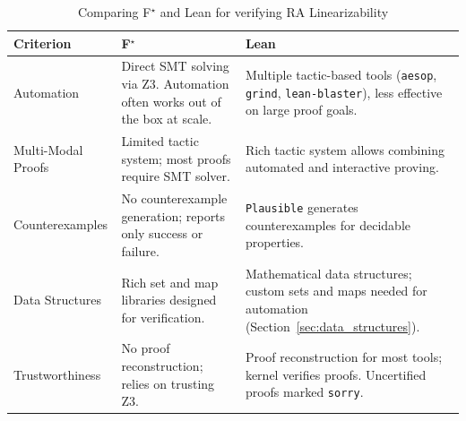 \documentclass[sigplan,twocolumn,accept]{acmart}
\newcommand{\fstar}{F$^{\star}$\xspace}
\begin{document}
\begin{table}[htpb]
\centering
\caption{Comparing \fstar and Lean for verifying RA Linearizability}
\label{tab:fstar_lean_comp}

\begin{tabular}{p{} p{} p{}}
\toprule
\textbf{Criterion} & \textbf{\fstar} & \textbf{Lean} \\
\midrule
Automation &
Direct SMT solving via Z3. Automation often works out of the box at scale.
&
Multiple tactic-based tools (\texttt{aesop}, \texttt{grind}, \texttt{lean-blaster}), less effective on large proof goals.
\\
\midrule
Multi-Modal Proofs &
Limited tactic system; most proofs require SMT solver.
&
Rich tactic system allows combining automated and interactive proving.
\\
\midrule
Counterexamples &
No counterexample generation; reports only success or failure.
&
\texttt{Plausible} generates counterexamples for decidable properties.
\\
\midrule
Data Structures &
Rich set and map libraries designed for verification.
&
Mathematical data structures; custom sets and maps needed for automation (Section~\ref{sec:data_structures}).
\\
\midrule
Trustworthiness &
No proof reconstruction; relies on trusting Z3.
&
Proof reconstruction for most tools; kernel verifies proofs. Uncertified proofs marked \texttt{sorry}.
\\
\bottomrule
\end{tabular}
\end{table}
\end{document}
